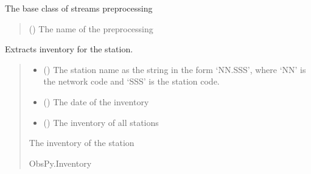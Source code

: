 \documentclass[letterpaper,10pt,english]{sphinxmanual}
\begin{document}
\begin{fulllineitems}
\label{\detokenize{api_core:core.signal_utils.StreamPreprocessing}}
\pysigstartsignatures
{}
\pysigstopsignatures
\sphinxAtStartPar
The base class of streams preprocessing
\begin{quote}\begin{description}
\sphinxAtStartPar
{} () \textendash{} The name of the preprocessing

\end{description}\end{quote}

\end{fulllineitems}


\begin{fulllineitems}
\label{\detokenize{api_core:core.signal_utils.get_inventory}}
\pysigstartsignatures
{}
\pysigstopsignatures
\sphinxAtStartPar
Extracts inventory for the station.
\begin{quote}\begin{description}
\begin{itemize}
\item {} 
\sphinxAtStartPar
{} () \textendash{} The station name as the string in the form ‘NN.SSS’,
where ‘NN’ is the network code and ‘SSS’ is the station code.

\item {} 
\sphinxAtStartPar
{} () \textendash{} The date of the inventory

\item {} 
\sphinxAtStartPar
{} () \textendash{} The inventory of all stations

\end{itemize}

\sphinxAtStartPar
The inventory of the station

\sphinxAtStartPar
ObsPy.Inventory

\end{description}\end{quote}

\end{fulllineitems}
\end{document}

